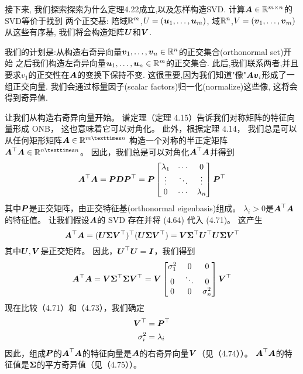接下来, 我们探索探索为什么定理4.22成立,以及怎样构造SVD.
计算$\A \in \R^{m \times n}$的SVD等价于找到
两个正交基:
陪域$\R^m$,$U = (\u_1,\dots,\u_m)$,
域$\R^n$,$V = (\v_1,\dots,\v_m)$
从这些有序基, 我们将会构造矩阵$\U$和$\V$.

我们的计划是:从构造右奇异向量$\v_1,\dots,\v_n \in \R^n$的正交集合(orthonormal set)开始
之后我们构造左奇异向量$\u_1,\dots,\u_n \in \R^m$的正交集合.
此后,我们联系两者,并且要求$v_1$的正交性在$\A$的变换下保持不变.
这很重要,因为我们知道"像"$\A\v_i$形成了一组正交向量.
我们会通过标量因子(scalar factors)归一化(normalize)这些像,
这将会得到奇异值.

让我们从构造右奇异向量开始。
谱定理（定理 4.15）告诉我们对称矩阵的特征向量形成 ONB，
这也意味着它可以对角化。
此外，根据定理 4.14，
我们总是可以从任何矩形矩阵$\A \in \R^{m×n}$
构造一个对称的半正定矩阵$\A^\top\A \in \R^{n×n}$。
因此，我们总是可以对角化$\A^\top\A$并得到
\begin{equation}
    \A^\top\A = \P\D\P^\top = \P
    \begin{bmatrix}
        \lambda_1 & \cdots & 0 \\
        \vdots & \ddots & \vdots \\
        0 & \cdots & \lambda_n
    \end{bmatrix}\P^\top
\end{equation}
其中$\P$是正交矩阵，由正交特征基(orthonormal eigenbasis)组成。
$\lambda_i > 0$是$\A^\top\A$的特征值。
让我们假设$\A$的 SVD 存在并将 (4.64) 代入 (4.71)。 这产生
\begin{equation}
    \A^\top\A =
    (\U\bs{\Sigma}\V^\top)^\top
    (\U\bs{\Sigma}\V^\top)
    = \V\bs{\Sigma}^\top\U^\top\U\bs{\Sigma}\V^\top
\end{equation}
其中$\U,\V$是正交矩阵。
因此，$\U^\top\U = \I$，我们得到
\begin{equation}
    \A^\top\A =
    \V\bs{\Sigma}^\top\bs{\Sigma}\V^\top =
    \V
    \begin{bmatrix}
        \sigma_1^2 & 0 & 0 \\
        0 & \ddots & 0 \\
        0 & 0 & \sigma_n^2
    \end{bmatrix}
    \V^\top
\end{equation}
现在比较（4.71）和（4.73），我们确定
\begin{align}
    \V^\top &= \P^\top \\
    \sigma_i^2 &= \lambda_i
\end{align}
因此，组成$\P$的$\A^\top\A$的特征向量是$\A$的右奇异向量$\V$（见（4.74））。
$\A^\top\A$的特征值是$\bs{\Sigma}$的平方奇异值（见（4.75））。

